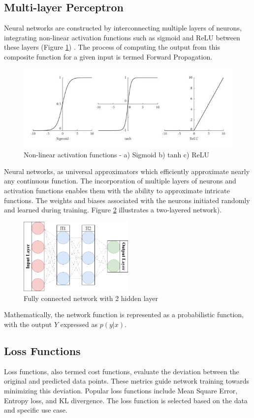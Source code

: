 \documentclass[12pt,twoside,a4paper,parskip]{scrbook} %
\begin{document}
\subsection{Multi-layer Perceptron}
Neural networks are constructed by interconnecting multiple layers of neurons, integrating non-linear activation functions such as sigmoid and ReLU between these layers (Figure \ref{fig:activation}) \cite{activation}. The process of computing the output from this composite function for a given input is termed Forward Propagation.
\begin{figure}[h]
    \centering
    \includegraphics[width=1\textwidth]{Images/activation.png}
    \caption{Non-linear activation functions - a) Sigmoid b) tanh c) ReLU}
    \label{fig:activation}
  \end{figure}
Neural networks, as universal approximators which efficiently approximate nearly any continuous function. The incorporation of multiple layers of neurons and activation functions enables them with the ability to approximate intricate functions. The weights and biases associated with the neurons initiated randomly and learned during training. Figure \ref{fig:mlp} illustrates a two-layered network).
\begin{figure}[h]
    \centering
    \includegraphics[width=0.5\textwidth]{Images/mlp.png}
    \caption{Fully connected network with 2 hidden layer}
    \label{fig:mlp}
  \end{figure}
Mathematically, the network function is represented as a probabilistic function, with the output \(Y\) expressed as \(p(y|x)\).
\subsection{Loss Functions}
Loss functions, also termed cost functions, evaluate the deviation between the original and predicted data points. These metrics guide network training towards minimizing this deviation. Popular loss functions include Mean Square Error, Entropy loss, and KL divergence. The loss function is selected based on the data and specific use case.
\end{document}
